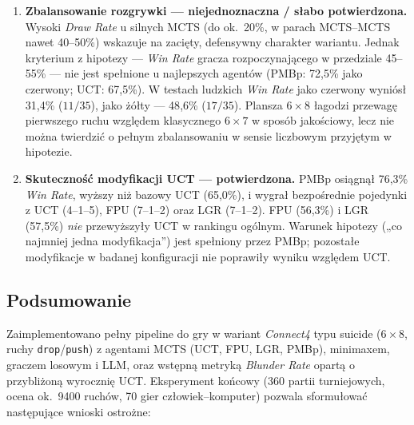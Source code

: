 \documentclass[11pt, a4paper]{article}
\begin{document}
\begin{enumerate}
    \textbf{Nie} uznajemy hipotezy za obaloną: brak dowodu na wyższą odporność PMBp nie jest dowodem na jej brak --- po prostu \textbf{nie zebrano danych} o jakości wymaganej do weryfikacji. Rozstrzygnięcie wymagałoby m.in.\ silniejszej lub bardziej bezstronnej wyroczni (np.\ głębszy minimax, większy budżet MCTS, analiza ludzka), większej liczby pozycji oraz ewentualnie niższego progu $\tau$ lub innych metryk jakości ruchu.

    \item \textbf{Zbalansowanie rozgrywki --- niejednoznaczna / słabo potwierdzona.}
    Wysoki \textit{Draw Rate} u silnych MCTS (do ok.\ 20\%, w parach MCTS--MCTS nawet 40--50\%) wskazuje na zacięty, defensywny charakter wariantu. Jednak kryterium z hipotezy --- \textit{Win Rate} gracza rozpoczynającego w przedziale 45--55\% --- nie jest spełnione u najlepszych agentów (PMBp: 72{,}5\% jako czerwony; UCT: 67{,}5\%). W testach ludzkich \textit{Win Rate} jako czerwony wyniósł 31{,}4\% ($11/35$), jako żółty --- 48{,}6\% ($17/35$). Plansza $6 \times 8$ łagodzi przewagę pierwszego ruchu względem klasycznego $6 \times 7$ w sposób jakościowy, lecz nie można twierdzić o pełnym zbalansowaniu w sensie liczbowym przyjętym w hipotezie.

    \item \textbf{Skuteczność modyfikacji UCT --- potwierdzona.}
    PMBp osiągnął 76{,}3\% \textit{Win Rate}, wyższy niż bazowy UCT (65{,}0\%), i wygrał bezpośrednie pojedynki z UCT (4--1--5), FPU (7--1--2) oraz LGR (7--1--2). FPU (56{,}3\%) i LGR (57{,}5\%) \emph{nie} przewyższyły UCT w rankingu ogólnym. Warunek hipotezy („co najmniej jedna modyfikacja”) jest spełniony przez PMBp; pozostałe modyfikacje w badanej konfiguracji nie poprawiły wyniku względem UCT.
\end{enumerate}

\subsection{Podsumowanie}

Zaimplementowano pełny pipeline do gry w wariant \textit{Connect4} typu suicide ($6 \times 8$, ruchy \texttt{drop}/\texttt{push}) z agentami MCTS (UCT, FPU, LGR, PMBp), minimaxem, graczem losowym i LLM, oraz wstępną metryką \textit{Blunder Rate} opartą o przybliżoną wyrocznię UCT. Eksperyment końcowy (360 partii turniejowych, ocena ok.\ 9400 ruchów, 70 gier człowiek--komputer) pozwala sformułować następujące wnioski ostrożne:
\end{document}
